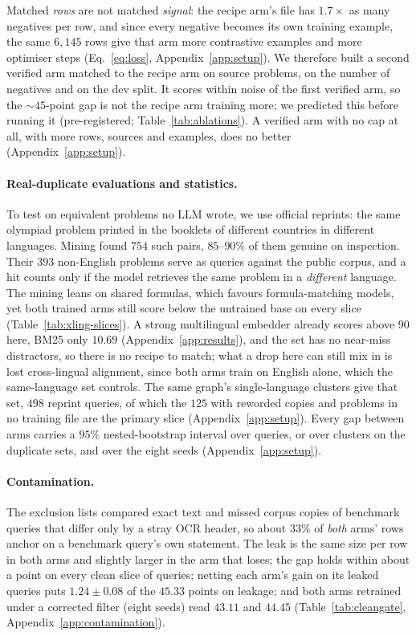 Matched \emph{rows} are not matched \emph{signal}: the recipe arm's file has $1.7\times$ as many negatives per row, and since every negative becomes its own training example, the same $6{,}145$ rows give that arm more contrastive examples and more optimiser steps (Eq.~\ref{eq:loss}, Appendix~\ref{app:setup}). We therefore built a second verified arm matched to the recipe arm on source problems, on the number of negatives and on the dev split. It scores within noise of the first verified arm, so the ${\sim}45$-point gap is not the recipe arm training more; we predicted this before running it (pre-registered; Table~\ref{tab:ablations}). A verified arm with no cap at all, with more rows, sources and examples, does no better (Appendix~\ref{app:setup}).

\paragraph{Real-duplicate evaluations and statistics.}
To test on equivalent problems no LLM wrote, we use official reprints: the same olympiad problem printed in the booklets of different countries in different languages. Mining found $754$ such pairs, $85$--$90\%$ of them genuine on inspection. Their $393$ non-English problems serve as queries against the public corpus, and a hit counts only if the model retrieves the same problem in a \emph{different} language. The mining leans on shared formulas, which favours formula-matching models, yet both trained arms still score below the untrained base on every slice (Table~\ref{tab:xling-slices}). A strong multilingual embedder already scores above $90$ here, BM25 only $10.69$ (Appendix~\ref{app:results}), and the set has no near-miss distractors, so there is no recipe to match; what a drop here can still mix in is lost cross-lingual alignment, since both arms train on English alone, which the same-language set controls. The same graph's single-language clusters give that set, $498$ reprint queries, of which the $125$ with reworded copies and problems in no training file are the primary slice (Appendix~\ref{app:setup}). Every gap between arms carries a $95\%$ nested-bootstrap interval over queries, or over clusters on the duplicate sets, and over the eight seeds (Appendix~\ref{app:setup}).

\paragraph{Contamination.}
The exclusion lists compared exact text and missed corpus copies of benchmark queries that differ only by a stray OCR header, so about $33\%$ of \emph{both} arms' rows anchor on a benchmark query's own statement. The leak is the same size per row in both arms and slightly larger in the arm that loses; the gap holds within about a point on every clean slice of queries; netting each arm's gain on its leaked queries puts $1.24 \pm 0.08$ of the $45.33$ points on leakage; and both arms retrained under a corrected filter (eight seeds) read $43.11$ and $44.45$ (Table~\ref{tab:cleangate}, Appendix~\ref{app:contamination}).
